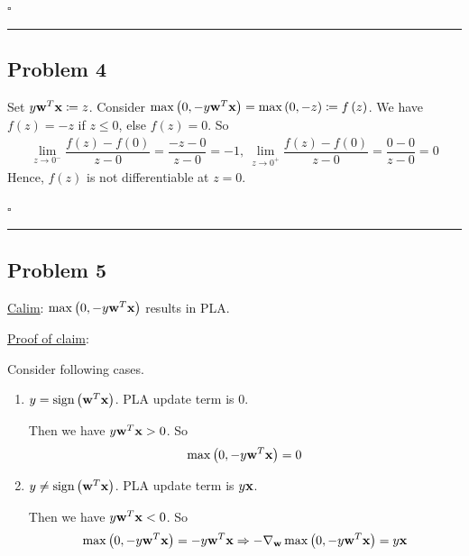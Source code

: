 \documentclass[12pt]{article}
\newcommand*{\QEDB}{\hfill\ensuremath{\square}}
\newcommand{\ParTh}[1]{\left(#1\right)}
\newcommand{\BF}[1]{{\bf#1}}
\newcommand{\horrule}[1]{\rule{\linewidth}{#1}}
\begin{document}
\QEDB

\horrule{0.5pt}

\subsection*{Problem 4}

Set $y\BF{w}^T\BF{x}\coloneqq z$. Consider $\max\ParTh{0,-y\BF{w}^T\BF{x}}=\max\ParTh{0,-z}\coloneqq f\ParTh{z}$. We have $f\ParTh{z}=-z$ if $z\leq0$, else $f\ParTh{z}=0$. So 
\begin{align}
\lim\limits_{z\rightarrow0^{-}}\dfrac{f\ParTh{z}-f\ParTh{0}}{z-0}=\dfrac{-z-0}{z-0}=-1,~\lim\limits_{z\rightarrow0^{+}}\dfrac{f\ParTh{z}-f\ParTh{0}}{z-0}=\dfrac{0-0}{z-0}=0
\end{align}
Hence, $f\ParTh{z}$ is not differentiable at $z=0$.

\QEDB

\horrule{0.5pt}

\subsection*{Problem 5}

\underline{Calim}: $\max\ParTh{0, -y\BF{w}^T\BF{x}}$ results in PLA.

\underline{Proof of claim}:

Consider following cases.
\begin{enumerate}
	\item $y = \text{sign}\ParTh{\BF{w}^T\BF{x}}$. PLA update term is 0.
	
	Then we have $y\BF{w}^T\BF{x} > 0$. So
	\begin{align}
	\max\ParTh{0, -y\BF{w}^T\BF{x}}=0
	\end{align}
	\item $y \neq \text{sign}\ParTh{\BF{w}^T\BF{x}}$. PLA update term is $y\BF{x}$.
	
	Then we have $y\BF{w}^T\BF{x} < 0$. So
	\begin{align}
	\max\ParTh{0, -y\BF{w}^T\BF{x}}=-y\BF{w}^T\BF{x}\Rightarrow-\nabla_{\BF{w}}\max\ParTh{0, -y\BF{w}^T\BF{x}}=y\BF{x}
	\end{align}
\end{enumerate}

\end{document}
